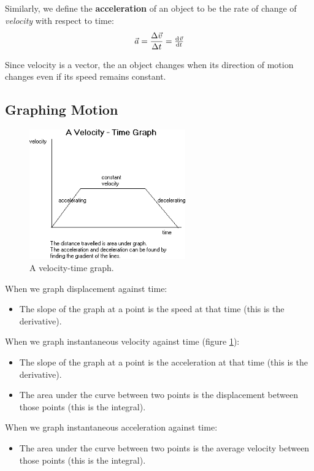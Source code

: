 \documentclass[a4paper]{amsbook}
\newcommand\capcite[1]{}
\begin{document}
Similarly, we define the \textbf{acceleration} of an object to be the rate of change of \textit{velocity} with
respect to time:
\begin{equation}
  \vec a = \frac{\Delta \vec v}{\Delta t} = \od{\vec v}{t}
\end{equation}

Since velocity is a vector, the an object changes when its direction of motion changes even if its
speed remains constant.

\subsection{Graphing Motion}
\begin{figure}
  \centering
  \includegraphics[width=0.6\textwidth]{vgraph}
  \caption{A velocity-time graph. \capcite{https://revisionworld.com/sites/revisionworld.com/files/imce/travelgraph2.gif}\label{fig:vgraph}}
\end{figure}
When we graph displacement against time:
\begin{itemize}
  \item The slope of the graph at a point is the speed at that time (this is the derivative).
\end{itemize}

When we graph instantaneous velocity against time (figure \ref{fig:vgraph}):
\begin{itemize}
  \item The slope of the graph at a point is the acceleration at that time (this is the derivative).
  \item The area under the curve between two points is the displacement between those points (this is the integral).
\end{itemize}

When we graph instantaneous acceleration against time:
\begin{itemize}
  \item The area under the curve between two points is the average velocity between those points (this is the integral).
\end{itemize}
\end{document}
